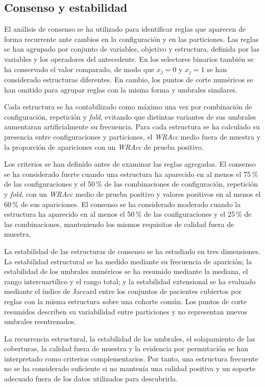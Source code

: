 \subsection{Consenso y estabilidad}

El análisis de consenso se ha utilizado para identificar reglas que aparecen de forma recurrente ante cambios en la configuración y en las particiones. Las reglas se han agrupado por conjunto de variables, objetivo y estructura, definida por las variables y los operadores del antecedente. En los selectores binarios también se ha conservado el valor comparado, de modo que \(x_j=0\) y \(x_j=1\) se han considerado estructuras diferentes. En cambio, los puntos de corte numéricos se han omitido para agrupar reglas con la misma forma y umbrales similares.

Cada estructura se ha contabilizado como máximo una vez por combinación de configuración, repetición y \textit{fold}, evitando que distintas variantes de sus umbrales aumentaran artificialmente su frecuencia. Para cada estructura se ha calculado su presencia entre configuraciones y particiones, el \textit{WRAcc} medio fuera de muestra y la proporción de apariciones con un \textit{WRAcc} de prueba positivo.

Los criterios se han definido antes de examinar las reglas agregadas. El consenso se ha considerado fuerte cuando una estructura ha aparecido en al menos el 75\,\% de las configuraciones y el 50\,\% de las combinaciones de configuración, repetición y \textit{fold}, con un \textit{WRAcc} medio de prueba positivo y valores positivos en al menos el 60\,\% de sus apariciones. El consenso se ha considerado moderado cuando la estructura ha aparecido en al menos el 50\,\% de las configuraciones y el 25\,\% de las combinaciones, manteniendo los mismos requisitos de calidad fuera de muestra.

La estabilidad de las estructuras de consenso se ha estudiado en tres dimensiones. La estabilidad estructural se ha medido mediante su frecuencia de aparición; la estabilidad de los umbrales numéricos se ha resumido mediante la mediana, el rango intercuartílico y el rango total; y la estabilidad extensional se ha evaluado mediante el índice de Jaccard entre los conjuntos de pacientes cubiertos por reglas con la misma estructura sobre una cohorte común. Los puntos de corte resumidos describen su variabilidad entre particiones y no representan nuevos umbrales reentrenados.

La recurrencia estructural, la estabilidad de los umbrales, el solapamiento de las coberturas, la calidad fuera de muestra y la evidencia por permutación se han interpretado como criterios complementarios. Por tanto, una estructura frecuente no se ha considerado suficiente si no mantenía una calidad positiva y un soporte adecuado fuera de los datos utilizados para descubrirla.


